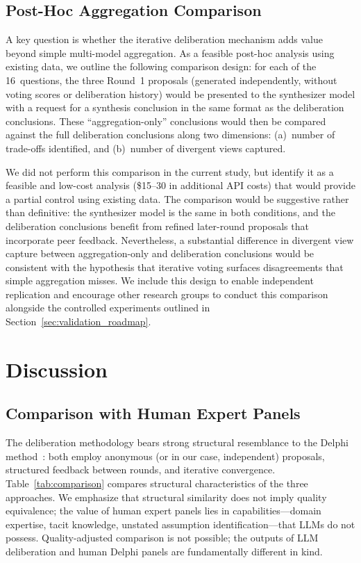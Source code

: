 \documentclass[11pt,a4paper]{article}
\begin{document}
\subsection{Post-Hoc Aggregation Comparison}
\label{sec:aggregation}

A key question is whether the iterative deliberation mechanism adds value beyond simple multi-model aggregation. As a feasible post-hoc analysis using existing data, we outline the following comparison design: for each of the 16~questions, the three Round~1 proposals (generated independently, without voting scores or deliberation history) would be presented to the synthesizer model with a request for a synthesis conclusion in the same format as the deliberation conclusions. These ``aggregation-only'' conclusions would then be compared against the full deliberation conclusions along two dimensions: (a)~number of trade-offs identified, and (b)~number of divergent views captured.

We did not perform this comparison in the current study, but identify it as a feasible and low-cost analysis (\$15--30 in additional API costs) that would provide a partial control using existing data. The comparison would be suggestive rather than definitive: the synthesizer model is the same in both conditions, and the deliberation conclusions benefit from refined later-round proposals that incorporate peer feedback. Nevertheless, a substantial difference in divergent view capture between aggregation-only and deliberation conclusions would be consistent with the hypothesis that iterative voting surfaces disagreements that simple aggregation misses. We include this design to enable independent replication and encourage other research groups to conduct this comparison alongside the controlled experiments outlined in Section~\ref{sec:validation_roadmap}.

\section{Discussion}
\label{sec:discussion}

\subsection{Comparison with Human Expert Panels}

The deliberation methodology bears strong structural resemblance to the Delphi method~\cite{linstone1975delphi}: both employ anonymous (or in our case, independent) proposals, structured feedback between rounds, and iterative convergence. Table~\ref{tab:comparison} compares structural characteristics of the three approaches. We emphasize that structural similarity does not imply quality equivalence; the value of human expert panels lies in capabilities---domain expertise, tacit knowledge, unstated assumption identification---that LLMs do not possess. Quality-adjusted comparison is not possible; the outputs of LLM deliberation and human Delphi panels are fundamentally different in kind.
\end{document}
